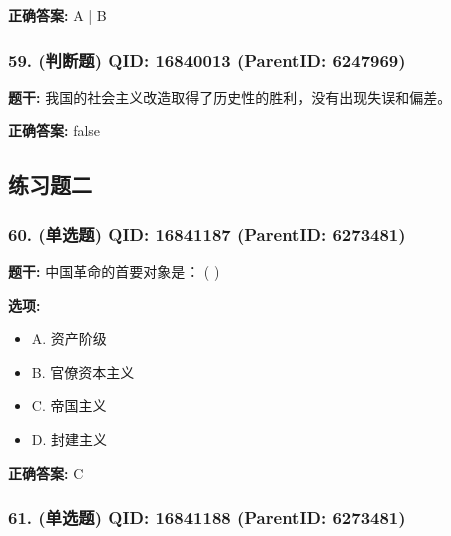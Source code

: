 \documentclass[12pt,UTF8]{ctexart}
\begin{document}
\textbf{正确答案:}
A | B

\vspace{0.3em}\hrulefill\vspace{0.7em}

\subsubsection*{59. (判断题) \small QID: 16840013 (ParentID: 6247969)}

\textbf{题干:}
我国的社会主义改造取得了历史性的胜利，没有出现失误和偏差。



\textbf{正确答案:}
false

\vspace{0.3em}\hrulefill\vspace{0.7em}

\subsection*{练习题二}

\subsubsection*{60. (单选题) \small QID: 16841187 (ParentID: 6273481)}

\textbf{题干:}
中国革命的首要对象是： ( )



\textbf{选项:}
\begin{itemize}[leftmargin=*]

  \item A. 资产阶级

  \item B. 官僚资本主义

  \item C. 帝国主义

  \item D. 封建主义

\end{itemize}

\textbf{正确答案:}
C

\vspace{0.3em}\hrulefill\vspace{0.7em}

\subsubsection*{61. (单选题) \small QID: 16841188 (ParentID: 6273481)}
\end{document}
